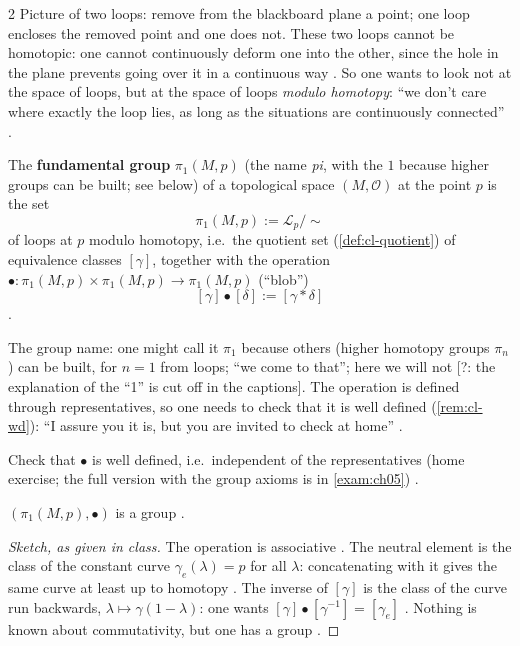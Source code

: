 \begin{paracol}{2}
Picture of two loops: remove from the blackboard plane a point; one loop encloses the removed point and one does not. These two loops cannot be homotopic: one cannot continuously deform one into the other, since the hole in the plane prevents
going over it in a continuous way . So one wants to look not at the space of loops, but at the space of loops \emph{modulo homotopy}:
``we don't care where exactly the loop lies, as long as the situations are continuously connected'' .

\begin{definition}\label{def:iv-pi1}
The \textbf{fundamental group} $\pi_1(M,p)$ (the name \emph{pi}, with the $1$ because higher groups can be built; see below) of a topological space $(M,\mathcal O)$ at the point $p$ is the set
\[
  \pi_1(M,p):=\mathcal L_p/{\sim}
\]
of loops at $p$ modulo homotopy, i.e.\ the quotient set (\cref{def:cl-quotient}) of equivalence classes $[\gamma]$, together with the operation $\bullet\colon\pi_1(M,p)\times\pi_1(M,p)\to\pi_1(M,p)$ (``blob'')
\[
  [\gamma]\bullet[\delta]:=[\gamma*\delta]
\]
.
\end{definition}
The group name: one might call it $\pi_1$ because others (higher homotopy groups $\pi_n$) can be built, for $n=1$ from loops; ``we come to that''; here we will not [?: the explanation of the ``1'' is cut off in the captions].
The operation is defined through representatives, so one needs to check that it is well defined (\cref{rem:cl-wd}): ``I assure you it is, but you are invited to check at home'' .
\begin{exercise}\label{ex:iv-wd}
Check that $\bullet$ is well defined, i.e.\ independent of the representatives (home exercise; the full version with the group axioms is in \cref{exam:ch05}) .
\end{exercise}

\begin{theorem}\label{thm:iv-group}
$(\pi_1(M,p),\bullet)$ is a group .
\end{theorem}
\begin{proof}[Sketch, as given in class]
The operation is associative . The neutral element is the class of the constant curve $\gamma_e(\lambda)=p$ for all $\lambda$: concatenating with it gives the same curve at least up to homotopy
. The inverse of $[\gamma]$ is the class of the curve run backwards, $\lambda\mapsto\gamma(1-\lambda)$: one wants $[\gamma]\bullet[\gamma^{-1}]=[\gamma_e]$
. Nothing is known about commutativity, but one has a group .
\end{proof}


\end{paracol}

